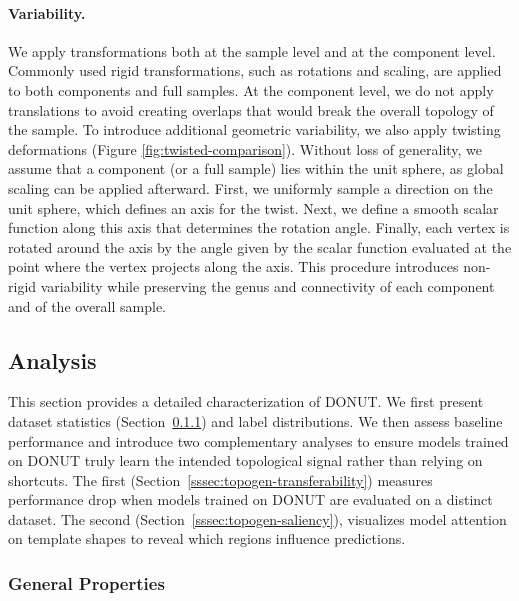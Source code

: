\paragraph{Variability.} 
We apply transformations both at the sample level and at the component level. Commonly used rigid transformations, such as rotations and scaling, are applied to both components and full samples. At the component level, we do not apply translations to avoid creating overlaps that would break the overall topology of the sample. To introduce additional geometric variability, we also apply twisting deformations (Figure \ref{fig:twisted-comparison}). Without loss of generality, we assume that a component (or a full sample) lies within the unit sphere, as global scaling can be applied afterward. First, we uniformly sample a direction on the unit sphere, which defines an axis for the twist. Next, we define a smooth scalar function along this axis that determines the rotation angle. Finally, each vertex is rotated around the axis by the angle given by the scalar function evaluated at the point where the vertex projects along the axis. This procedure introduces non-rigid variability while preserving the genus and connectivity of each component and of the overall sample.

\subsection{Analysis}

This section provides a detailed characterization of DONUT. We first present dataset statistics (Section~\ref{sssec:topogen-general-properties}) and label distributions. We then assess baseline performance and introduce two complementary analyses to ensure models trained on DONUT truly learn the intended topological signal rather than relying on shortcuts. The first (Section~\ref{sssec:topogen-transferability}) measures performance drop when models trained on DONUT are evaluated on a distinct dataset. The second (Section~\ref{sssec:topogen-saliency}), visualizes model attention on template shapes to reveal which regions influence predictions.

\subsubsection{General Properties}
\label{sssec:topogen-general-properties}

